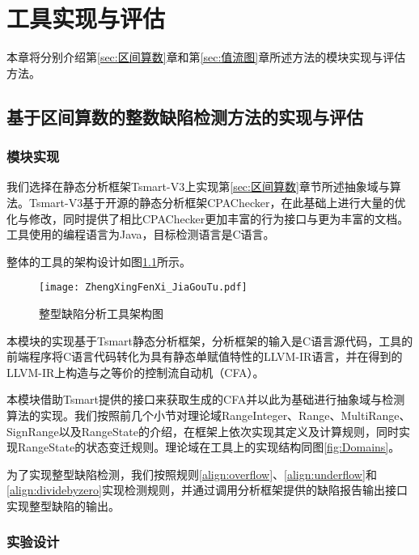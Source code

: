 
\chapter{工具实现与评估}
\label{sec:实验与评估}

本章将分别介绍第\ref{sec:区间算数}章和第\ref{sec:值流图}章所述方法的模块实现与评估方法。

\section{基于区间算数的整数缺陷检测方法的实现与评估}
\label{sec:区间算数评估与结果}

\subsection{模块实现} 
\label{sec:区间算数模块实现}

我们选择在静态分析框架Tsmart-V3上实现第\ref{sec:区间算数}章节所述抽象域与算法。Tsmart-V3基于开源的静态分析框架CPAChecker，在此基础上进行大量的优化与修改，同时提供了相比CPAChecker更加丰富的行为接口与更为丰富的文档。工具使用的编程语言为Java，目标检测语言是C语言。

整体的工具的架构设计如图\ref{fig:整型分析架构图}所示。

\begin{figure}[H]
	\centering
	\texttt{[image: ZhengXingFenXi\_JiaGouTu.pdf]}
	\caption{整型缺陷分析工具架构图}
	\label{fig:整型分析架构图}
\end{figure}

本模块的实现基于Tsmart静态分析框架，分析框架的输入是C语言源代码，工具的前端程序将C语言代码转化为具有静态单赋值特性的LLVM-IR语言，并在得到的LLVM-IR上构造与之等价的控制流自动机（CFA）。

本模块借助Tsmart提供的接口来获取生成的CFA并以此为基础进行抽象域与检测算法的实现。我们按照前几个小节对理论域RangeInteger、Range、MultiRange、SignRange以及RangeState的介绍，在框架上依次实现其定义及计算规则，同时实现RangeState的状态变迁规则。理论域在工具上的实现结构同图\ref{fig:Domains}。

为了实现整型缺陷检测，我们按照规则\ref{align:overflow}、\ref{align:underflow}和\ref{align:dividebyzero}实现检测规则，并通过调用分析框架提供的缺陷报告输出接口实现整型缺陷的输出。

\subsection{实验设计}

